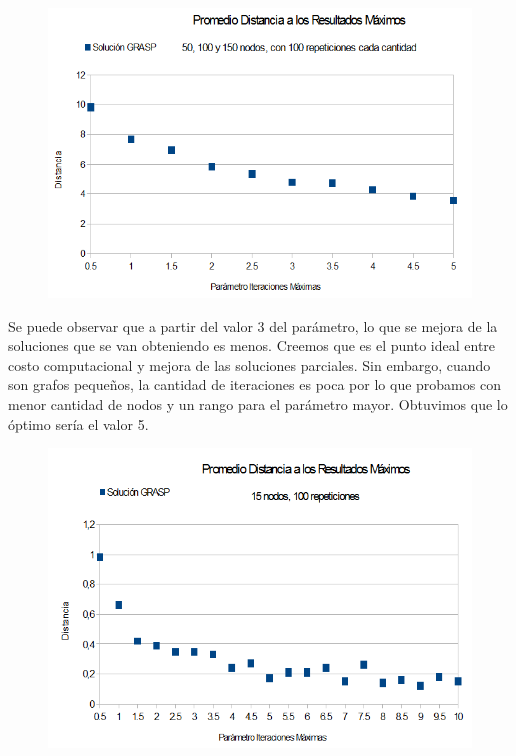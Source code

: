 \begin{itemize}
\begin{figure}[H]
	\centering
	\includegraphics[scale=0.6]{optimizacionGRASPParIterMax.png}
\end{figure}

\quad Se puede observar que a partir del valor 3 del parámetro, lo que se mejora de la soluciones que se van obteniendo es menos. Creemos que es el punto ideal entre costo computacional y mejora de las soluciones parciales. Sin embargo, cuando son grafos pequeños, la cantidad de iteraciones es poca por lo que probamos con menor cantidad de nodos y un rango para el parámetro mayor. Obtuvimos que lo óptimo sería el valor 5.

\begin{figure}[H]
	\centering
	\includegraphics[scale=0.6]{optimizacionGRASPParIterMax2.png}
\end{figure}


\end{itemize}
